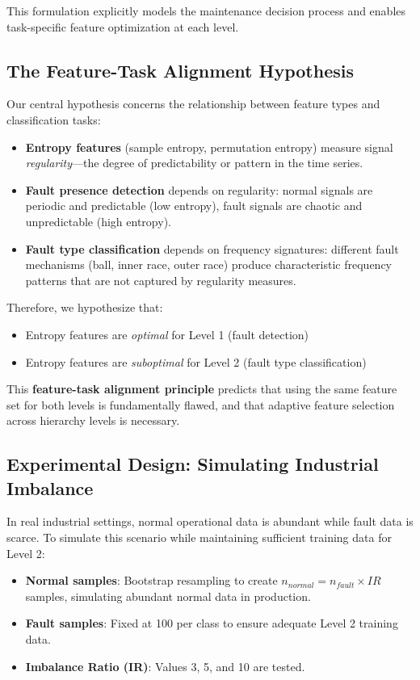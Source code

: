 \documentclass[11pt]{article}
\begin{document}
This formulation explicitly models the maintenance decision process and enables task-specific feature optimization at each level.

\subsection{The Feature-Task Alignment Hypothesis}
Our central hypothesis concerns the relationship between feature types and classification tasks:

\begin{itemize}
    \item \textbf{Entropy features} (sample entropy, permutation entropy) measure signal \emph{regularity}---the degree of predictability or pattern in the time series.
    \item \textbf{Fault presence detection} depends on regularity: normal signals are periodic and predictable (low entropy), fault signals are chaotic and unpredictable (high entropy).
    \item \textbf{Fault type classification} depends on frequency signatures: different fault mechanisms (ball, inner race, outer race) produce characteristic frequency patterns that are not captured by regularity measures.
\end{itemize}

Therefore, we hypothesize that:
\begin{itemize}
    \item Entropy features are \emph{optimal} for Level 1 (fault detection)
    \item Entropy features are \emph{suboptimal} for Level 2 (fault type classification)
\end{itemize}

This \textbf{feature-task alignment principle} predicts that using the same feature set for both levels is fundamentally flawed, and that adaptive feature selection across hierarchy levels is necessary.

\subsection{Experimental Design: Simulating Industrial Imbalance}
In real industrial settings, normal operational data is abundant while fault data is scarce. To simulate this scenario while maintaining sufficient training data for Level 2:

\begin{itemize}
    \item \textbf{Normal samples}: Bootstrap resampling to create $n_{normal} = n_{fault} \times IR$ samples, simulating abundant normal data in production.
    \item \textbf{Fault samples}: Fixed at 100 per class to ensure adequate Level 2 training data.
    \item \textbf{Imbalance Ratio (IR)}: Values 3, 5, and 10 are tested.
\end{itemize}
\end{document}
